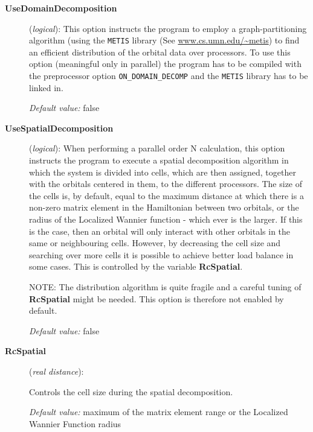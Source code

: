 \documentclass[11pt]{article}
\begin{document}
\begin{description}

\item[{\bf UseDomainDecomposition}] ({\it logical}):
   This
  option instructs the program to employ a graph-partitioning
  algorithm (using the {\tt METIS} library (See \url{www.cs.umn.edu/~metis}) 
  to find an efficient distribution of the
  orbital data over processors.  To use this option (meaningful only
  in parallel) the program has to be compiled with the preprocessor
  option {\tt ON\_DOMAIN\_DECOMP} and the {\tt METIS} library has to
  be linked in.

{\it Default value:}  false

\item[{\bf UseSpatialDecomposition}] ({\it logical}):
   When
  performing a parallel order N calculation, this option instructs the
  program to execute a spatial decomposition algorithm in which the
  system is divided into cells, which are then assigned, together with
  the orbitals centered in them, to the different processors. The size
  of the cells is, by default, equal to the maximum distance at which
  there is a non-zero matrix element in the Hamiltonian between two
  orbitals, or the radius of the Localized Wannier function - which
  ever is the larger. If this is the case, then an orbital will only
  interact with other orbitals in the same or neighbouring
  cells. However, by decreasing the cell size and searching over more
  cells it is possible to achieve better load balance in some
  cases. This is controlled by the variable {\bf RcSpatial}.

NOTE: The distribution algorithm is quite fragile and a careful tuning
of {\bf RcSpatial} might be needed. This option is therefore not
enabled by default.

{\it Default value:}  false

\item[{\bf RcSpatial}] ({\it real distance}):

Controls the cell size during the spatial decomposition.

{\it Default value:}  maximum of the matrix element range or the
Localized Wannier Function radius

\end{description}


\vspace{5pt}
\end{document}

